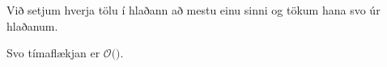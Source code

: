 {
	\only<all:1>{\ngeAA}
	\only<all:2>{\ngeAB}
	\only<all:3>{\ngeAC}
	\only<all:4>{\ngeAD}
	\only<all:5>{\ngeAE}
	\only<all:6>{\ngeAF}
	\only<all:7>{\ngeAG}
	\only<all:8>{\ngeAH}
	\only<all:9>{\ngeAI}
	\only<all:10>{\ngeAJ}
	\only<all:11>{\ngeAK}
	\only<all:12>{\ngeAL}
	\only<all:13>{\ngeAM}
	\only<all:14>{\ngeAN}
	\only<all:15>{\ngeAO}
	\only<all:16>{\ngeAP}
	\only<all:17>{\ngeAQ}
	\only<all:18>{\ngeAR}
	\only<all:19>{\ngeAS}
	\only<all:20>{\ngeAT}
	\only<all:21>{\ngeAU}
	\only<all:22>{\ngeAV}
	\only<all:23>{\ngeAW}
	\only<all:24>{\ngeAX}
	\only<all:25>{\ngeAY}
	\only<all:26>{\ngeAZ}
	\only<all:27>{\ngeBA}
	\only<all:28>{\ngeBB}
	\only<all:29>{\ngeBC}
	\only<all:30>{\ngeBD}
	\only<all:31>{\ngeBE}
	\only<all:32>{\ngeBF}
	\only<all:33>{\ngeBG}
	\only<all:34>{\ngeBH}
	\only<all:35>{\ngeBI}
	\only<all:36>{\ngeBJ}
	\only<all:37>{\ngeBK}
	\only<all:38>{\ngeBL}
	\only<all:39>{\ngeBM}
	\only<all:40>{\ngeBN}
	\only<all:41>{\ngeBO}
	\only<all:42>{\ngeBP}
}

{
}

{

	{
		\item<1-> Við setjum hverja tölu í hlaðann að mestu einu sinni og tökum hana svo úr hlaðanum.
		\item<2-> Svo tímaflækjan er $\mathcal{O}($\onslide<3->{$\,n\,$}$)$.
	}
}

{
}


